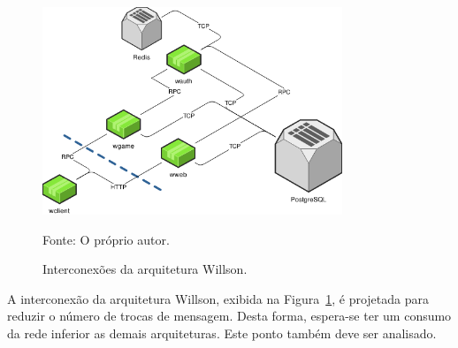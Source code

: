 \begin{figure}[htb!]
  \caption{Interconexões da arquitetura Willson.}
  \label{fig:interconexao_willson}
  \includegraphics[width=0.8\textwidth]{figuras/interconexoes/willson.png}
  \centering

  Fonte: O próprio autor.
\end{figure}

A interconexão da arquitetura Willson, exibida na Figura~\ref{fig:interconexao_willson}, é projetada para reduzir o número de trocas de mensagem. Desta forma, espera-se ter um consumo da rede inferior as demais arquiteturas. Este ponto também deve ser analisado.
